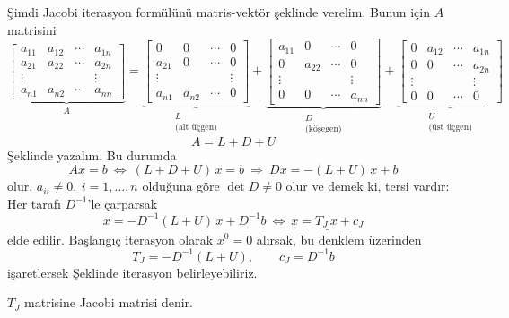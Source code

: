 \documentclass[11pt,a4paper]{article}
\begin{document}
Şimdi Jacobi iterasyon formülünü matris-vektör şeklinde verelim. Bunun için $A$ matrisini
{\small\setlength{\arraycolsep}{2.5pt}
\[
  \underbrace{\begin{bmatrix}a_{11}&a_{12}&\cdots&a_{1n}\\a_{21}&a_{22}&\cdots&a_{2n}\\\vdots&&&\vdots\\a_{n1}&a_{n2}&\cdots&a_{nn}\end{bmatrix}}_{A}
  =\underbrace{\begin{bmatrix}0&0&\cdots&0\\a_{21}&0&\cdots&0\\\vdots&&&\vdots\\a_{n1}&a_{n2}&\cdots&0\end{bmatrix}}_{\substack{L\\ \text{(alt üçgen)}}}
  +\underbrace{\begin{bmatrix}a_{11}&0&\cdots&0\\0&a_{22}&\cdots&0\\\vdots&&&\vdots\\0&0&\cdots&a_{nn}\end{bmatrix}}_{\substack{D\\ \text{(köşegen)}}}
  +\underbrace{\begin{bmatrix}0&a_{12}&\cdots&a_{1n}\\0&0&\cdots&a_{2n}\\\vdots&&&\vdots\\0&0&\cdots&0\end{bmatrix}}_{\substack{U\\ \text{(üst üçgen)}}}
\]}
\[ A=L+D+U \]
Şeklinde yazalım. Bu durumda
\[ Ax=b \ \Leftrightarrow\ (L+D+U)\,x=b \ \Rightarrow\ Dx=-(L+U)\,x+b \]
olur. $a_{ii}\neq 0,\ i=1,\dots,n$ olduğuna göre $\det D\neq 0$ olur ve demek ki, tersi vardır: Her tarafı $D^{-1}$'le çarparsak
\[ x=-D^{-1}(L+U)\,x+D^{-1}b \ \Leftrightarrow\ \underline{x=T_J\,x+c_J} \]
elde edilir.
Başlangıç iterasyon olarak $x^{0}=0$ alırsak, bu denklem üzerinden
\[ T_J=-D^{-1}(L+U),\qquad c_J=D^{-1}b \]
işaretlersek
Şeklinde iterasyon belirleyebiliriz.

$T_J$ matrisine Jacobi matrisi denir.
\end{document}
